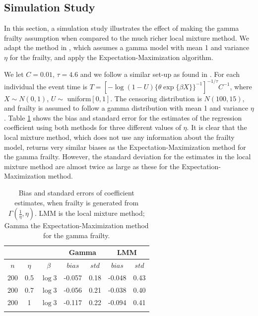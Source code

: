 \documentclass[graybox]{svmult}
\begin{document}
\subsection{Simulation Study}\label{Simulation}
In this section, a simulation study  illustrates  the  effect of making  the    gamma frailty assumption  when compared to the much richer  local mixture
method. We adapt the method in \cite{Klein1992}, which assumes a gamma model with mean
1 and variance $\eta$ for the frailty, and apply the Expectation-Maximization algorithm.

We let $C=0.01$, $\tau=4.6$ and we follow a similar set-up as found in \cite{Hsu2004}. For each individual
the event time is $T=[ -\log(1-U) \{  \theta \exp\{\beta X\} \}^{-1}] ^{-1/\tau} C^{-1}$, where
$X\sim N(0,1)$, $U\sim$ uniform$[0,1]$. The censoring distribution is $N(100,15)$, and frailty
is assumed to follow a gamma distribution with mean 1 and variance $\eta$. Table \ref{simulLMMnew}
shows the bias and standard error for the estimates of the regression coefficient using both
methods for three different values of $\eta$. It is clear that the local mixture method, which
does not use any information about the frailty model, returns very similar biases as the Expectation-Maximization method for the gamma frailty. However, the standard deviation for the estimates in the local mixture method are almost twice as large as these
for the Expectation-Maximization method.  

\begin{table}[h!]
\caption{Bias and standard errors of coefficient estimates, when frailty 
is generated from $\Gamma(\frac{1}{\eta},\eta)$. LMM is the local mixture method; Gamma the 
Expectation-Maximization method for the gamma frailty.}
\label{simulLMMnew}
\begin{center}
\begin{tabular}{c c c c c c c}

\hline %
& & &\multicolumn{2}{c}{Gamma } & \multicolumn{2}{c}{LMM}\\ [0.3ex]
\hline
$n$ & $\eta$ & $\beta$ &  $bias$ & $std$ & $bias$ & $std$ \\ [0.3ex]%
\hline 
200 & 0.5&  $\log{3}$ & -0.057  & 0.18 & -0.048 & 0.43 \\ %
200 & 0.7&  $\log{3}$ & -0.056  & 0.21 & -0.038 & 0.40 \\ %
200 & 1&  $\log{3}$ & -0.117  & 0.22 & -0.094 & 0.41 \\ %
\hline\\
\end{tabular}
\end{center}
\end{table}
\end{document}

